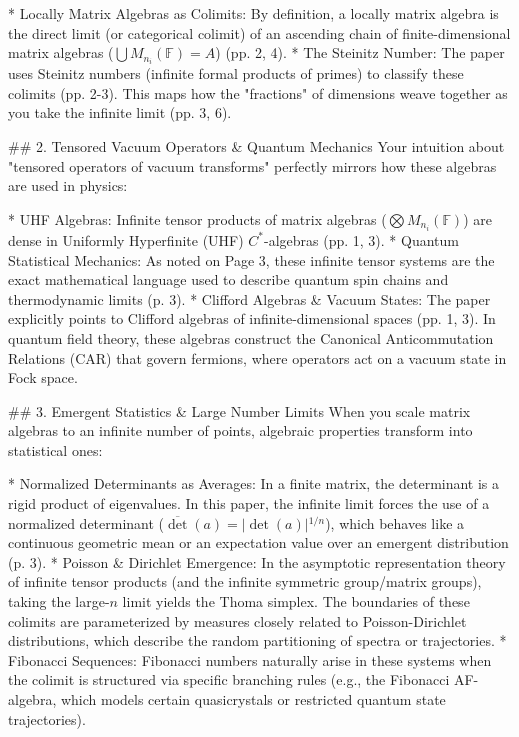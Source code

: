 * Locally Matrix Algebras as Colimits: By definition, a locally matrix algebra is the direct limit (or categorical colimit) of an ascending chain of finite-dimensional matrix algebras ($\bigcup M_{n_i}(\mathbb{F}) = A$) (pp. 2, 4).
* The Steinitz Number: The paper uses Steinitz numbers (infinite formal products of primes) to classify these colimits (pp. 2-3). This maps how the "fractions" of dimensions weave together as you take the infinite limit (pp. 3, 6).

## 2. Tensored Vacuum Operators & Quantum Mechanics
Your intuition about "tensored operators of vacuum transforms" perfectly mirrors how these algebras are used in physics:

* UHF Algebras: Infinite tensor products of matrix algebras ($\bigotimes M_{n_i}(\mathbb{F})$) are dense in Uniformly Hyperfinite (UHF) $C^*$-algebras (pp. 1, 3).
* Quantum Statistical Mechanics: As noted on Page 3, these infinite tensor systems are the exact mathematical language used to describe quantum spin chains and thermodynamic limits (p. 3).
* Clifford Algebras & Vacuum States: The paper explicitly points to Clifford algebras of infinite-dimensional spaces (pp. 1, 3). In quantum field theory, these algebras construct the Canonical Anticommutation Relations (CAR) that govern fermions, where operators act on a vacuum state in Fock space.

## 3. Emergent Statistics & Large Number Limits
When you scale matrix algebras to an infinite number of points, algebraic properties transform into statistical ones:

* Normalized Determinants as Averages: In a finite matrix, the determinant is a rigid product of eigenvalues. In this paper, the infinite limit forces the use of a normalized determinant ($\overline{\det}(a) = \vert{}\det(a)\vert{}^{1/n}$), which behaves like a continuous geometric mean or an expectation value over an emergent distribution (p. 3).
* Poisson & Dirichlet Emergence: In the asymptotic representation theory of infinite tensor products (and the infinite symmetric group/matrix groups), taking the large-$n$ limit yields the Thoma simplex. The boundaries of these colimits are parameterized by measures closely related to Poisson-Dirichlet distributions, which describe the random partitioning of spectra or trajectories.
* Fibonacci Sequences: Fibonacci numbers naturally arise in these systems when the colimit is structured via specific branching rules (e.g., the Fibonacci AF-algebra, which models certain quasicrystals or restricted quantum state trajectories).

